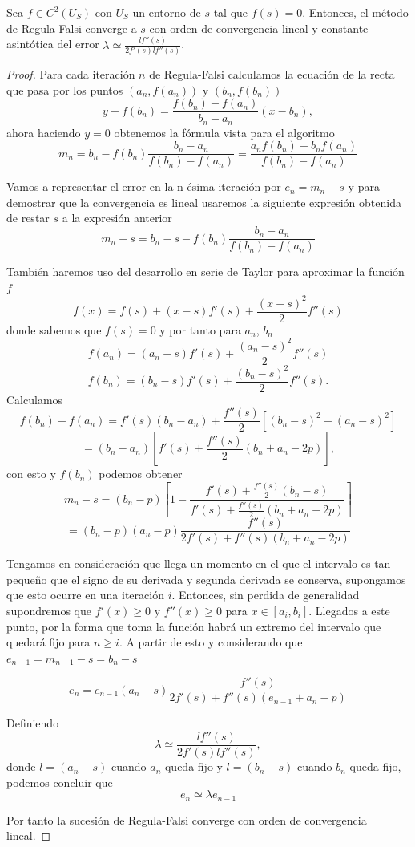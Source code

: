 \begin{teorema}
	Sea $f \in C^2(U_S)$ con $U_S$ un entorno de $s$ tal que $f(s) = 0$. Entonces, el método de Regula-Falsi converge a $s$ con orden de convergencia lineal y constante asintótica del error $\lambda \simeq \frac{l f''(s)}{2 f'(s) l f''(s)}$.
	
\end{teorema}

\begin{proof}
	Para cada iteración $n$ de Regula-Falsi calculamos la ecuación de la recta que pasa por los puntos $(a_n, f(a_n))$ y $(b_n, f(b_n))$
	\[
		y - f(b_n) = \frac{f(b_n) - f(a_n)}{b_n - a_n}(x - b_n),
	\]
	ahora haciendo $y = 0$ obtenemos la fórmula vista para el algoritmo
	\[
		m_n = b_n - f(b_n) \frac{b_n - a_n}{f(b_n) - f(a_n)} = \frac{a_n f(b_n) - b_n f(a_n)}{f(b_n) - f(a_n)}
	\]
	
	Vamos a representar el error en la n-ésima iteración por $e_n = m_n - s$ y para demostrar que la convergencia es lineal usaremos la siguiente expresión obtenida de restar $s$ a la expresión anterior
	\[
		m_n - s = b_n - s - f(b_n) \frac{b_n - a_n}{f(b_n) - f(a_n)}
	\]
	
	También haremos uso del desarrollo en serie de Taylor para aproximar la función $f$
	\[
		f(x) = f(s) + (x - s) f'(s) + \frac{(x - s)^2}{2} f''(s)
	\]
	donde sabemos que $f(s) = 0$ y por tanto para $a_n$, $b_n$
	\[
		f(a_n) = (a_n - s) f'(s) + \frac{(a_n - s)^2}{2} f''(s)
	\]
	\[
		f(b_n) = (b_n - s) f'(s) + \frac{(b_n - s)^2}{2} f''(s).
	\]
	Calculamos
	\[
		f(b_n) - f(a_n) = f'(s) (b_n - a_n) + \frac{f''(s)}{2}[(b_n - s)^2 - (a_n - s)^2]
	\]
	\[
		= (b_n - a_n) [f'(s) + \frac{f''(s)}{2} (b_n + a_n - 2p)],
	\]
	con esto y $f(b_n)$ podemos obtener
	\[
		m_n - s = (b_n - p)[1 - \frac{f'(s) + \frac{f''(s)}{2} (b_n - s)}{f'(s) + \frac{f''(s)}{2} (b_n + a_n - 2p)}]
	\]
	\[
		= (b_n - p) (a_n - p) \frac{f''(s)}{2 f'(s) + f''(s) (b_n + a_n - 2p)}
	\]
	
	Tengamos en consideración que llega un momento en el que el intervalo es tan pequeño que el signo de su derivada y segunda derivada se conserva, supongamos que esto ocurre en una iteración $i$. Entonces, sin perdida de generalidad supondremos que $f'(x) \geq 0$ y $f''(x) \geq 0$ para $x \in [a_i, b_i]$. Llegados a este punto, por la forma que toma la función habrá un extremo del intervalo que quedará fijo para $n \geq i$. A partir de esto y considerando que $e_{n-1} = m_{n-1} - s = b_n - s$
	
	\[
		e_n = e_{n-1} (a_n - s) \frac{f''(s)}{2 f'(s) + f''(s) (e_{n-1} + a_n - p)}
	\]
	
	Definiendo
	\[
		\lambda \simeq \frac{l f''(s)}{2 f'(s) l f''(s)},
	\]
	donde $l = (a_n - s)$ cuando $a_n$ queda fijo y $l = (b_n - s)$ cuando $b_n$ queda fijo, podemos concluir que
	\[
		e_n \simeq \lambda e_{n-1}
	\]
	
	Por tanto la sucesión de Regula-Falsi converge con orden de convergencia lineal.
\end{proof}
${ }$\\


